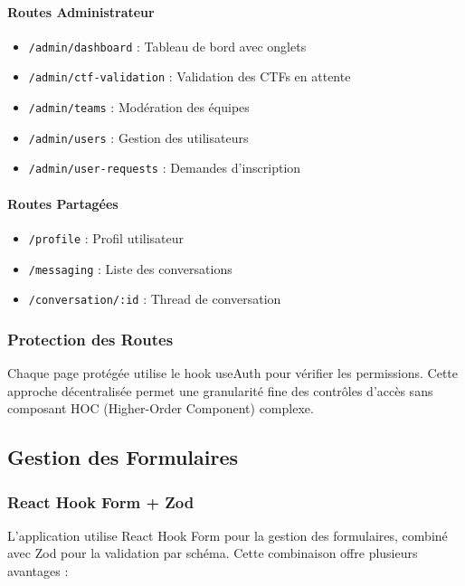 \paragraph{Routes Administrateur}
\begin{itemize}
    \item \texttt{/admin/dashboard} : Tableau de bord avec onglets
    \item \texttt{/admin/ctf-validation} : Validation des CTFs en attente
    \item \texttt{/admin/teams} : Modération des équipes
    \item \texttt{/admin/users} : Gestion des utilisateurs
    \item \texttt{/admin/user-requests} : Demandes d'inscription
\end{itemize}

\paragraph{Routes Partagées}
\begin{itemize}
    \item \texttt{/profile} : Profil utilisateur
    \item \texttt{/messaging} : Liste des conversations
    \item \texttt{/conversation/:id} : Thread de conversation
\end{itemize}

\subsubsection{Protection des Routes}

Chaque page protégée utilise le hook useAuth pour vérifier les permissions. Cette approche décentralisée permet une granularité fine des contrôles d'accès sans composant HOC (Higher-Order Component) complexe.

\subsection{Gestion des Formulaires}

\subsubsection{React Hook Form + Zod}

L'application utilise React Hook Form pour la gestion des formulaires, combiné avec Zod pour la validation par schéma. Cette combinaison offre plusieurs avantages :

